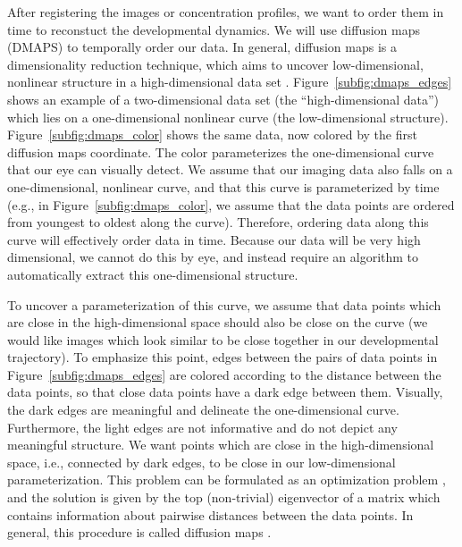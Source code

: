 \documentclass{pnastwo}
\begin{document}
\begin{article}
After registering the images or concentration profiles, we want to order them in time to reconstuct the developmental dynamics. 
%
We will use diffusion maps (DMAPS) to temporally order our data.
%
In general, diffusion maps is a dimensionality reduction technique, which aims to uncover low-dimensional, nonlinear structure in a high-dimensional data set \cite{coifman2005geometric}. 
%
Figure~\ref{subfig:dmaps_edges} shows an example of a two-dimensional data set (the ``high-dimensional data'') which lies on a one-dimensional nonlinear curve (the low-dimensional structure).
%
Figure~\ref{subfig:dmaps_color} shows the same data, now colored by the first diffusion maps coordinate.
%
The color parameterizes the one-dimensional curve that our eye can visually detect.
%
We assume that our imaging data also falls on a one-dimensional, nonlinear curve, and that this curve is parameterized by time (e.g., in Figure~\ref{subfig:dmaps_color}, we assume that the data points are ordered from youngest to oldest along the curve). 
%
Therefore, ordering data along this curve will effectively order data in time.
%
Because our data will be very high dimensional, we cannot do this by eye, and instead require an algorithm to automatically extract this one-dimensional structure.

To uncover a parameterization of this curve, we assume that data points which are close in the high-dimensional space should also be close on the curve (we would like images which look similar to be close together in our developmental trajectory).
%
%
To emphasize this point, edges between the pairs of data points in Figure~\ref{subfig:dmaps_edges} are colored according to the distance between the data points, so that close data points have a dark edge between them.
%
Visually, the dark edges are meaningful and delineate the one-dimensional curve.
%
Furthermore, the light edges are not informative and do not depict any meaningful structure. 
%
We want points which are close in the high-dimensional space, i.e., connected by dark edges, to be close in our low-dimensional parameterization.
%
This problem can be formulated as an optimization problem \cite{Belkin2003}, and the solution is given by the top (non-trivial) eigenvector of a matrix which contains information about pairwise distances between the data points. 
%
In general, this procedure is called diffusion maps \cite{coifman2005geometric}.%


\end{article}
\end{document}
